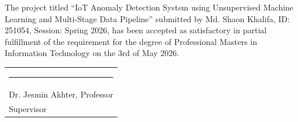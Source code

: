 The project titled ``IoT Anomaly Detection System using Unsupervised Machine Learning and Multi-Stage Data Pipeline'' submitted by Md. Shaon Khalifa, ID: 251054, Session: Spring 2026, has been accepted as satisfactory in partial fulfillment of the requirement for the degree of Professional Masters in Information Technology on the 3rd of May 2026.

\bigskip
\bigskip
\bigskip

\noindent \begin{tabular}{l}
  \rule{4cm}{1pt} \\
  Dr. Jesmin Akhter, Professor\\
  Supervisor\\
\end{tabular}
